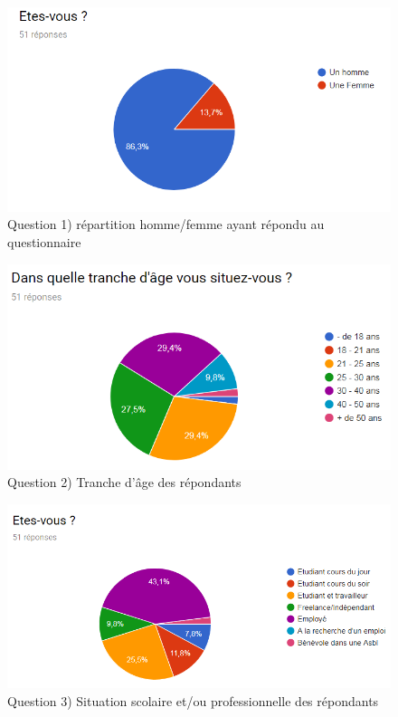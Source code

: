 \documentclass[a4paper,fleqn,12pt,oneside]{report}
\begin{document}
\begin{figure}[!ht]
\centering
\includegraphics[scale=1]{figures/QHF.png}
\caption{Question 1) répartition homme/femme ayant répondu au questionnaire}
\label{fig:QHF}
\end{figure}
\begin{figure}[!ht]
\centering
\includegraphics[scale=1]{figures/QAge.png}
\caption{Question 2) Tranche d'âge des répondants}
\label{fig:QAge}
\end{figure}
\begin{figure}[!ht]
\centering
\includegraphics[scale=1]{figures/QStatus.png}
\caption{Question 3) Situation scolaire et/ou professionnelle des répondants}
\label{fig:QStatus}
\end{figure}
\end{document}
